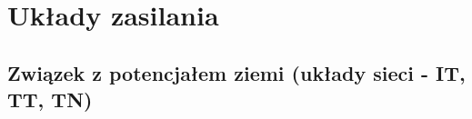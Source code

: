 % 
% 
% 
% 

\section{Układy zasilania}

\subsection{Związek z potencjałem ziemi (układy sieci - IT, TT, TN)}

